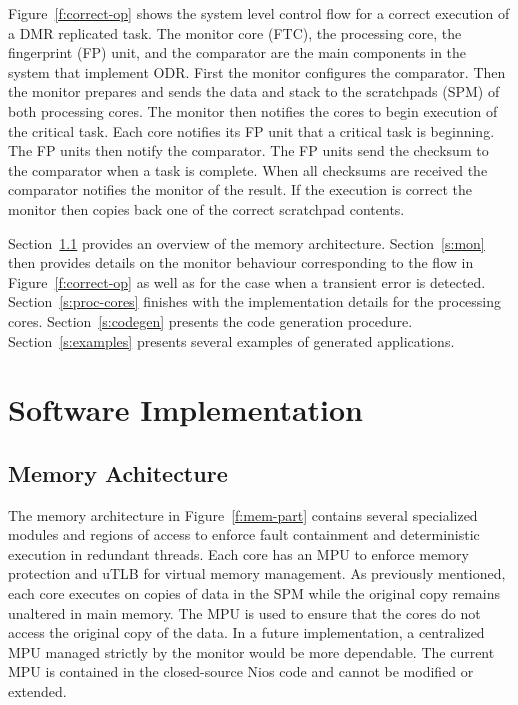 	Figure~\ref{f:correct-op} shows the system level control flow for a correct execution of a DMR replicated task.
	The monitor core (FTC), the processing core, the fingerprint (FP) unit, and the comparator are the main components in the system that implement ODR. 
	First the monitor configures the comparator. 
	Then the monitor prepares and sends the data and stack to the scratchpads (SPM) of both processing cores. 
	The monitor then notifies the cores to begin execution of the critical task. 
	Each core notifies its FP unit that a critical task is beginning. 
	The FP units then notify the comparator. 
	The FP units send the checksum to the comparator when a task is complete. 
	When all checksums are received the comparator notifies the monitor of the result. 
	If the execution is correct the monitor then copies back one of the correct scratchpad contents. 





	Section~\ref{s:mem-arch} provides an overview of the memory architecture. 
	Section~\ref{s:mon} then provides details on the monitor behaviour corresponding to the flow in Figure~\ref{f:correct-op} as well as for the case when a transient error is detected.
	Section~\ref{s:proc-cores} finishes with the implementation details for the processing cores.
	Section~\ref{s:codegen} presents the code generation procedure.
	Section~\ref{s:examples} presents several examples of generated applications.
	
\section{Software Implementation }
\subsection{Memory Achitecture}
\label{s:mem-arch}
	The memory architecture in Figure~\ref{f:mem-part} contains several specialized modules and regions of access to enforce fault containment and deterministic execution in redundant threads. 
	Each core has an MPU to enforce memory protection and uTLB for virtual memory management. 
	As previously mentioned, each core executes on copies of data in the SPM while the original copy remains unaltered in main memory. 
	The MPU is used to ensure that the cores do not access the original copy of the data. 
	In a future implementation, a centralized MPU managed strictly by the monitor would be more dependable. 
	The current MPU is contained in the closed-source Nios code and cannot be modified or extended. 

